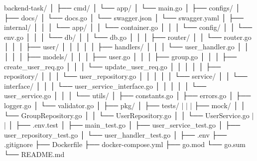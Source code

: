 backend-task/
│
├── cmd/
│   └── app/
│       └── main.go 
│
├── configs/
│
├── docs/
│     └── docs.go 
│     └── swagger.json 
│     └── swagger.yaml 
│
├── internal/
│   │ 
│   └── app/
│   │   └── container.go 
│   │ 
│   └── config/
│   │   └── env.go 
│   │ 
│   └── db/
│   │   └── db.go 
│   │ 
│   ├── router/
│   │   └── router.go    
│   │
│   ├── user/
│   │   │ 
│   │   ├── handlers/
│   │   │   └── user_handler.go
│   │   │   
│   │   ├── models/
│   │   │   ├── user.go
│   │   │   ├── group.go
│   │   │   ├── create_user_req.go
│   │   │   └── update_user_req.go
│   │   │   
│   │   ├── repository/
│   │   │   └── user_repository.go
│   │   │   
│   │   └── service/
│   │       └── interface/
│   │       │     └── user_service_interface.go
│   │       │
│   │       └── user_service.go
│   │
│   └── utils/
│       ├── constants.go
│       ├── errors.go
│       ├── logger.go
│       └── validator.go
│ 
├── pkg/
│
├── tests/
|   |
|   ├── mock/
│   │    └── GroupRepository.go
│   │    └── UserRepository.go
│   │    └── UserService.go
|   |
│   ├── .env.test
│   ├── main_test.go
│   ├── user_service_test.go
│   ├── user_repository_test.go
│   └── user_handler_test.go
│
├── .env
├── .gitignore
├── Dockerfile
├── docker-compose.yml
├── go.mod
└── go.sum
└── README.md
